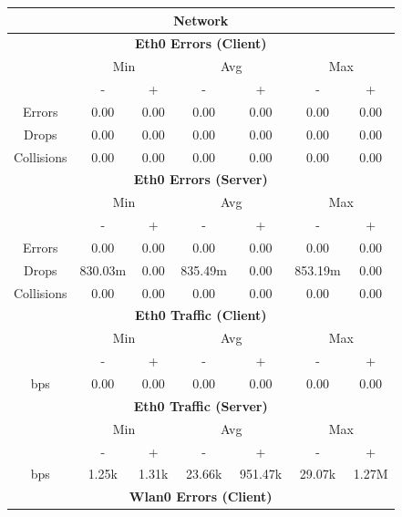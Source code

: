 \documentclass[11pt,a4paper]{scrreprt}
\begin{document}
\begin{table}[H]
\centering
    \begin{tabular}{||c|c|c|c|c|c|c||}
    \hline
    \multicolumn{7}{|c|}{\textbf{Network}} \\
    \hline
    \multicolumn{7}{|c|}{\textbf{Eth0 Errors (Client)}} \\
    \hline\hline
      & \multicolumn{2}{|c|}{Min} & \multicolumn{2}{|c|}{Avg} & \multicolumn{2}{|c|}{Max} \\
    \hline
     & - & + & - & + & - & + \\
    \hline
    Errors & 0.00 & 0.00 & 0.00 & 0.00 & 0.00 & 0.00 \\
    \hline
    Drops & 0.00 & 0.00 & 0.00 & 0.00 & 0.00 & 0.00 \\
    \hline
    Collisions & 0.00 & 0.00 & 0.00 & 0.00 & 0.00 & 0.00 \\
    \hline\hline
    \multicolumn{7}{|c|}{\textbf{Eth0 Errors (Server)}} \\
    \hline\hline
      & \multicolumn{2}{|c|}{Min} & \multicolumn{2}{|c|}{Avg} & \multicolumn{2}{|c|}{Max} \\
    \hline
     & - & + & - & + & - & + \\
    \hline
    Errors & 0.00 & 0.00 & 0.00 & 0.00 & 0.00 & 0.00 \\
    \hline
    Drops & 830.03m & 0.00 & 835.49m & 0.00 & 853.19m & 0.00 \\
    \hline
    Collisions & 0.00 & 0.00 & 0.00 & 0.00 & 0.00 & 0.00 \\
    \hline\hline
    \multicolumn{7}{|c|}{\textbf{Eth0 Traffic (Client)}} \\
    \hline\hline
      & \multicolumn{2}{|c|}{Min} & \multicolumn{2}{|c|}{Avg} & \multicolumn{2}{|c|}{Max} \\
    \hline
      & - & + & - & + & - & + \\
    \hline
    bps & 0.00 & 0.00 & 0.00 & 0.00 & 0.00 & 0.00 \\
    \hline\hline
    \multicolumn{7}{|c|}{\textbf{Eth0 Traffic (Server)}} \\
    \hline\hline
      & \multicolumn{2}{|c|}{Min} & \multicolumn{2}{|c|}{Avg} & \multicolumn{2}{|c|}{Max} \\
    \hline
      & - & + & - & + & - & + \\
    \hline
    bps & 1.25k & 1.31k & 23.66k & 951.47k & 29.07k & 1.27M \\
    \hline\hline
    \multicolumn{7}{|c|}{\textbf{Wlan0 Errors (Client)}} \\

\end{tabular}
\end{table}
\end{document}
